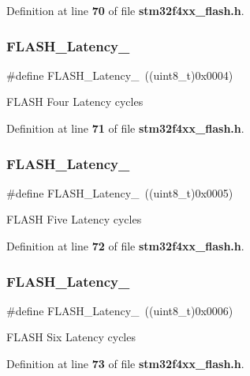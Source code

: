 Definition at line \textbf{ 70} of file \textbf{ stm32f4xx\+\_\+flash.\+h}.

\mbox{\label{group__Flash__Latency_ga74a5deaec2020e484ce576925ff7de16}} 
\subsubsection{F\+L\+A\+S\+H\+\_\+\+Latency\+\_}
{\footnotesize\ttfamily \#define F\+L\+A\+S\+H\+\_\+\+Latency\+\_~((uint8\+\_\+t)0x0004)}

F\+L\+A\+SH Four Latency cycles 

Definition at line \textbf{ 71} of file \textbf{ stm32f4xx\+\_\+flash.\+h}.

\mbox{\label{group__Flash__Latency_ga8e52670ad258b0a95c94b99b8d7eab27}} 
\subsubsection{F\+L\+A\+S\+H\+\_\+\+Latency\+\_}
{\footnotesize\ttfamily \#define F\+L\+A\+S\+H\+\_\+\+Latency\+\_~((uint8\+\_\+t)0x0005)}

F\+L\+A\+SH Five Latency cycles 

Definition at line \textbf{ 72} of file \textbf{ stm32f4xx\+\_\+flash.\+h}.

\mbox{\label{group__Flash__Latency_ga053dfbef3307536ff40a5ceb2576a4a3}} 
\subsubsection{F\+L\+A\+S\+H\+\_\+\+Latency\+\_}
{\footnotesize\ttfamily \#define F\+L\+A\+S\+H\+\_\+\+Latency\+\_~((uint8\+\_\+t)0x0006)}

F\+L\+A\+SH Six Latency cycles 

Definition at line \textbf{ 73} of file \textbf{ stm32f4xx\+\_\+flash.\+h}.

